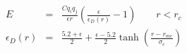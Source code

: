 \documentclass[12pt]{article}
\begin{document}
\begin{eqnarray*}
 E & = & \frac{Cq_iq_j}{\epsilon r} \left( \frac{\epsilon}{\epsilon_D(r)}-1\right)                       \qquad r < r_c \\
 \epsilon_D(r) & = & \frac{5.2+\epsilon}{2} +  \frac{\epsilon-5.2}{2}\tanh\left(\frac{r-r_{me}}{\sigma_e}\right) 
\end{eqnarray*}
\end{document}
